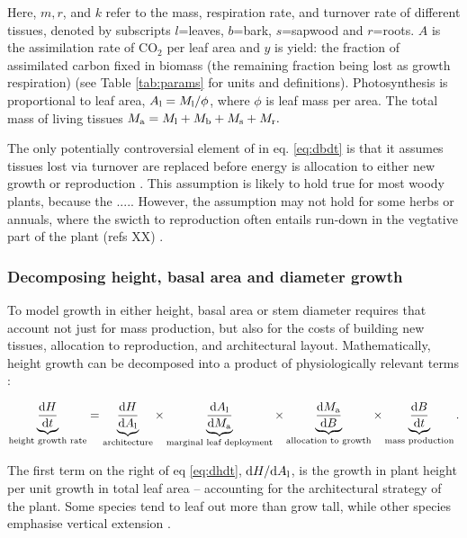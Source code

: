 \documentclass[12pt, a4paper]{article}
\begin{document}
Here, $m,r$, and $k$ refer to the mass, respiration rate, and
turnover rate of different tissues, denoted by subscripts $l$=leaves,
$b$=bark, $s$=sapwood and $r$=roots. $A$ is the assimilation
rate of CO$_2$ per leaf area and $y$ is yield: the fraction of
assimilated carbon fixed in biomass (the remaining fraction being lost
as growth respiration) (see Table \ref{tab:params} for units and
definitions). Photosynthesis is proportional to leaf area,
$A_{\rm l} = M_{\rm l} / \phi$, where $\phi$ is leaf mass per area.
The total mass of living tissues $M_{\rm a}=M_{\rm l}+M_{\rm b}+M_\textrm{s}+M_{\rm r}.$

The only potentially controversial element of in eq. \ref{eq:dbdt} is that it assumes tissues lost via turnover are replaced before energy is allocation to either new growth or reproduction \citep{Thornley-2000}. This assumption is likely to hold true for most woody plants, because the ..... However, the assumption may not hold for some herbs or annuals, where the swicth to reproduction often entails run-down in the vegtative part of the plant (refs XX) \citep{ Thornley-2000}.

\subsubsection{Decomposing height, basal area and diameter growth}

To model growth in either height, basal area or stem diameter requires that account not just for mass production, but also for the costs of building new tissues, allocation to reproduction, and architectural layout. Mathematically, height growth can be decomposed into a product of physiologically relevant terms \citep{falster-2011}:

\begin{equation} \label{eq:dhdt}
\underbrace{\strut\frac{{\rm d}H}{{\rm d}t}}_\textrm{height growth rate}= \underbrace{\strut\frac{{\rm d}H}{{\rm d}A_{\rm l}}}_\textrm{architecture}
\times \underbrace{\strut\frac{{\rm d}A_{\rm l}}{{\rm d}M_{\rm a}}}_\textrm{marginal leaf deployment}
\times \underbrace{\strut\frac{{\rm d}M_{\rm a}}{{\rm d}B}}_\textrm{allocation to growth}
\times \underbrace{\strut\frac{{\rm d}B}{{\rm d}t}}_\textrm{mass production}.
\end{equation}

The first term on the right of eq \ref{eq:dhdt},
${\rm d}H / {\rm d}A_{\rm l}$, is the growth in plant height
per unit growth in total leaf area -- accounting for the architectural
strategy of the plant. Some species tend to leaf out more than grow
tall, while other species emphasise vertical
extension \citep{poorter-2006}.
\end{document}
